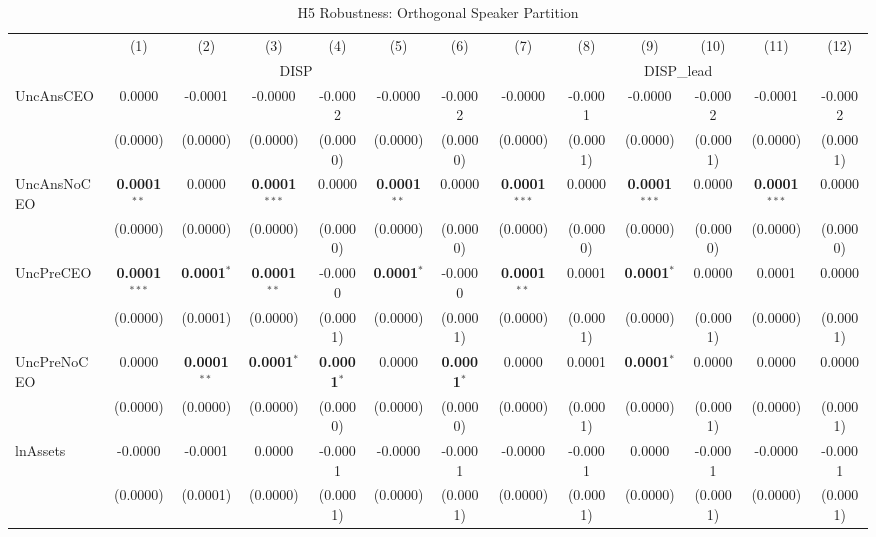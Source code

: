 \begin{landscape}
\begin{table}[H]
\setlength{\tabcolsep}{3pt}
\renewcommand{\arraystretch}{0.85}
\centering
\caption{H5 Robustness: Orthogonal Speaker Partition}
\label{tab:h5_robust}
\scriptsize
\begin{tabular}{lcccccccccccc}
\toprule
 & (1) & (2) & (3) & (4) & (5) & (6) & (7) & (8) & (9) & (10) & (11) & (12) \\
 & \multicolumn{6}{c}{DISP} & \multicolumn{6}{c}{DISP\_lead} \\
\cmidrule(lr){2-7} \cmidrule(lr){8-13}
\midrule
UncAnsCEO & 0.0000 & -0.0001 & -0.0000 & -0.0002 & -0.0000 & -0.0002 & -0.0000 & -0.0001 & -0.0000 & -0.0002 & -0.0001 & -0.0002 \\
 & (0.0000) & (0.0000) & (0.0000) & (0.0000) & (0.0000) & (0.0000) & (0.0000) & (0.0001) & (0.0000) & (0.0001) & (0.0000) & (0.0001) \\
UncAnsNoCEO & \textbf{0.0001}$^{**}$ & 0.0000 & \textbf{0.0001}$^{***}$ & 0.0000 & \textbf{0.0001}$^{**}$ & 0.0000 & \textbf{0.0001}$^{***}$ & 0.0000 & \textbf{0.0001}$^{***}$ & 0.0000 & \textbf{0.0001}$^{***}$ & 0.0000 \\
 & (0.0000) & (0.0000) & (0.0000) & (0.0000) & (0.0000) & (0.0000) & (0.0000) & (0.0000) & (0.0000) & (0.0000) & (0.0000) & (0.0000) \\
UncPreCEO & \textbf{0.0001}$^{***}$ & \textbf{0.0001}$^{*}$ & \textbf{0.0001}$^{**}$ & -0.0000 & \textbf{0.0001}$^{*}$ & -0.0000 & \textbf{0.0001}$^{**}$ & 0.0001 & \textbf{0.0001}$^{*}$ & 0.0000 & 0.0001 & 0.0000 \\
 & (0.0000) & (0.0001) & (0.0000) & (0.0001) & (0.0000) & (0.0001) & (0.0000) & (0.0001) & (0.0000) & (0.0001) & (0.0000) & (0.0001) \\
UncPreNoCEO & 0.0000 & \textbf{0.0001}$^{**}$ & \textbf{0.0001}$^{*}$ & \textbf{0.0001}$^{*}$ & 0.0000 & \textbf{0.0001}$^{*}$ & 0.0000 & 0.0001 & \textbf{0.0001}$^{*}$ & 0.0000 & 0.0000 & 0.0000 \\
 & (0.0000) & (0.0000) & (0.0000) & (0.0000) & (0.0000) & (0.0000) & (0.0000) & (0.0001) & (0.0000) & (0.0001) & (0.0000) & (0.0001) \\
\midrule
lnAssets & -0.0000 & -0.0001 & 0.0000 & -0.0001 & -0.0000 & -0.0001 & -0.0000 & -0.0001 & 0.0000 & -0.0001 & -0.0000 & -0.0001 \\
 & (0.0000) & (0.0001) & (0.0000) & (0.0001) & (0.0000) & (0.0001) & (0.0000) & (0.0001) & (0.0000) & (0.0001) & (0.0000) & (0.0001) \\

\end{tabular}
\end{table}
\end{landscape}
